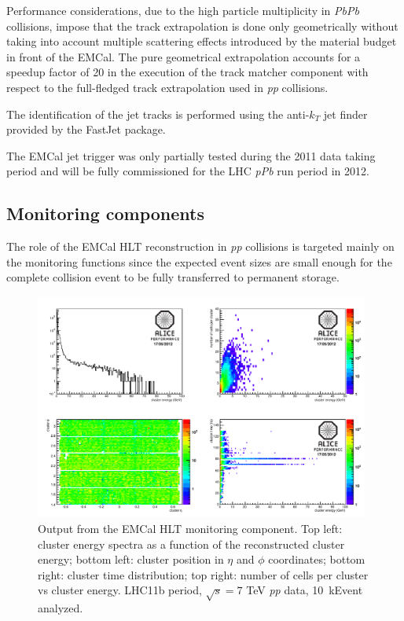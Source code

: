 Performance considerations, due to the high particle multiplicity    
in {\it PbPb} collisions, impose that the track extrapolation is done only geometrically
without taking into account  multiple scattering effects
introduced by the material budget in front of the EMCal. 
The pure geometrical extrapolation accounts for a speedup factor of 20 in the
execution of the track matcher component with respect to the 
full-fledged track extrapolation used in {\it pp} collisions.

The identification of the jet tracks is performed using the anti-$k_T$ 
jet finder provided by the FastJet package.

The EMCal jet trigger was only partially tested during the 2011 data taking period
and will be fully commissioned for the LHC {\it pPb} run period in 2012.

\subsection{Monitoring components}

The role of the EMCal HLT reconstruction in {\it pp} collisions is targeted mainly on 
the monitoring functions since the expected event sizes are small enough for 
the complete collision event to be fully transferred to permanent storage. 
\begin{figure}[h]
\includegraphics[width=26pc]{figures/all-monitor.pdf}
\begin{center}
\caption{\label{f2} Output from the EMCal HLT monitoring component. Top left: cluster energy spectra as a function of the  reconstructed cluster energy; 
bottom left: cluster position in  $\eta$ and $\phi$ coordinates; bottom right: cluster time distribution; top right: number of cells per cluster vs cluster 
energy. LHC11b period, $\sqrt{s}=7$ TeV {\it pp} data, 10~kEvent analyzed.}
\end{center}
\end{figure}

